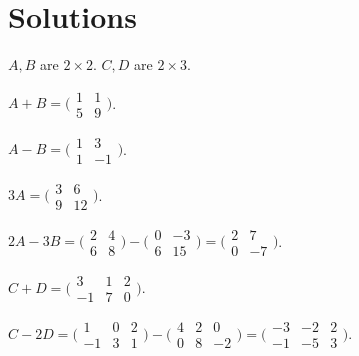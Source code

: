 \section{Solutions}

\begin{solutions}
  \item $A, B$ are $2 \times 2$. $C, D$ are $2 \times 3$.

  \item $A + B = \bigl(\begin{smallmatrix} 1 & 1 \\ 5 & 9 \end{smallmatrix}\bigr)$.

  \item $A - B = \bigl(\begin{smallmatrix} 1 & 3 \\ 1 & -1 \end{smallmatrix}\bigr)$.

  \item $3 A = \bigl(\begin{smallmatrix} 3 & 6 \\ 9 & 12 \end{smallmatrix}\bigr)$.

  \item $2 A - 3 B = \bigl(\begin{smallmatrix} 2 & 4 \\ 6 & 8 \end{smallmatrix}\bigr) - \bigl(\begin{smallmatrix} 0 & -3 \\ 6 & 15 \end{smallmatrix}\bigr) = \bigl(\begin{smallmatrix} 2 & 7 \\ 0 & -7 \end{smallmatrix}\bigr)$.

  \item $C + D = \bigl(\begin{smallmatrix} 3 & 1 & 2 \\ -1 & 7 & 0 \end{smallmatrix}\bigr)$.

  \item $C - 2 D = \bigl(\begin{smallmatrix} 1 & 0 & 2 \\ -1 & 3 & 1 \end{smallmatrix}\bigr) - \bigl(\begin{smallmatrix} 4 & 2 & 0 \\ 0 & 8 & -2 \end{smallmatrix}\bigr) = \bigl(\begin{smallmatrix} -3 & -2 & 2 \\ -1 & -5 & 3 \end{smallmatrix}\bigr)$.


\end{solutions}
